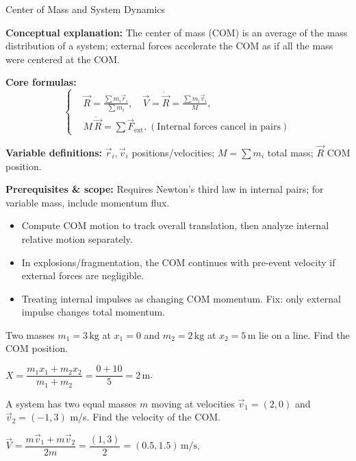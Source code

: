 \begin{KnowledgePoint}{Center of Mass and System Dynamics \Core}
  \KPFormulas
  \begin{formulabox}
  \textbf{Conceptual explanation:} The center of mass (COM) is an average of the mass distribution of a system; external forces accelerate the COM as if all the mass were centered at the COM.

  \textbf{Core formulas:}
  \[
  \left\{\begin{aligned}
    &\vec R=\frac{\sum m_i\vec r_i}{\sum m_i},\quad \vec V=\dot{\vec R}=\frac{\sum m_i\vec v_i}{M},\\
    &M\,\ddot{\vec R}=\sum \vec F_{\text{ext}}.\ (\text{Internal forces cancel in pairs})
  \end{aligned}\right.
  \]

  \textbf{Variable definitions:} $\vec r_i,\vec v_i$ positions/velocities; $M=\sum m_i$ total mass; $\vec R$ COM position.

  

  \textbf{Prerequisites \& scope:} Requires Newton's third law in internal pairs; for variable mass, include momentum flux.
  \end{formulabox}

  \KPHeuristics
  \begin{heuristicsbox}
  \begin{itemize}[leftmargin=*]
    \item Compute COM motion to track overall translation, then analyze internal relative motion separately.
    \item In explosions/fragmentation, the COM continues with pre-event velocity if external forces are negligible.
  \end{itemize}
  \vspace{0.4em}
  \begin{itemize}[leftmargin=*]
    \item Treating internal impulses as changing COM momentum. Fix: only external impulse changes total momentum.
  \end{itemize}
  \end{heuristicsbox}

  \KPProblems
\begin{cheatproblem}
  Two masses $m_1=3\,\text{kg}$ at $x_1=0$ and $m_2=2\,\text{kg}$ at $x_2=5\,\text{m}$ lie on a line. Find the COM position.
\begin{solutionbox}
  $X=\dfrac{m_1x_1+m_2x_2}{m_1+m_2}=\dfrac{0+10}{5}=2\,\text{m}$.
\end{solutionbox}
\end{cheatproblem}
\begin{cheatproblem}
  A system has two equal masses $m$ moving at velocities $\vec v_1=(2,0)$ and $\vec v_2=(-1,3)$ m/s. Find the velocity of the COM.
\begin{solutionbox}
  $\vec V=\dfrac{m\vec v_1+m\vec v_2}{2m}=\dfrac{(1,3)}{2}=(0.5,1.5)\,\text{m/s}$.
\end{solutionbox}
\end{cheatproblem}
\end{KnowledgePoint}

